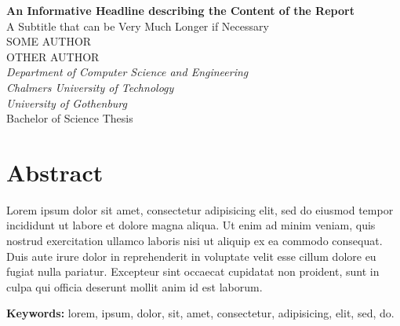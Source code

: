 \large
\textbf{An Informative Headline describing the Content of the Report}\\
A Subtitle that can be Very Much Longer if Necessary\\[0.7cm]
SOME AUTHOR\\
OTHER AUTHOR\\
\normalsize
\textit{Department of Computer Science and Engineering\\
Chalmers University of Technology\\
University of Gothenburg}\\[0.7cm]
Bachelor of Science Thesis
\setlength{\parskip}{0.5cm}

\thispagestyle{plain}			%
\setlength{\parskip}{0pt plus 1.0pt}
\section*{Abstract}
Lorem ipsum dolor sit amet, consectetur adipisicing elit, sed do eiusmod tempor incididunt ut labore et dolore magna aliqua. Ut enim ad minim veniam, quis nostrud exercitation ullamco laboris nisi ut aliquip ex ea commodo consequat. Duis aute irure dolor in reprehenderit in voluptate velit esse cillum dolore eu fugiat nulla pariatur. Excepteur sint occaecat cupidatat non proident, sunt in culpa qui officia deserunt mollit anim id est laborum.

\vfill
\textbf{Keywords:} lorem, ipsum, dolor, sit, amet, consectetur, adipisicing, elit, sed, do.

\newpage				%
\thispagestyle{empty}
\mbox{}